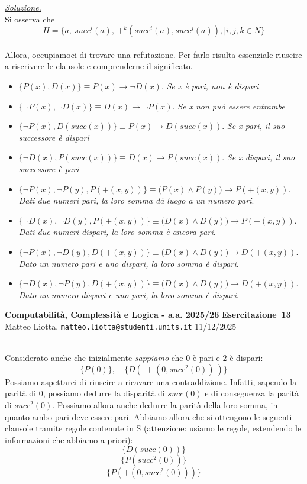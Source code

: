 \documentclass[a4paper,10pt]{article}
\makeatletter
\newcommand{\EsercitazioneNum}{13}
\newcommand{\Data}{11/12/2025}
\newcommand{\DocType}{Esercitazione} %
\newcommand{\FullTitle}{\DocType\ \EsercitazioneNum}
\newcommand{\Header}{
\noindent
  \small \textbf{Computabilità, Complessità e Logica - a.a. 2025/26} \hfill \textbf{\FullTitle} \\[0.2cm]
  \scriptsize Matteo Liotta, \texttt{matteo.liotta@studenti.units.it} \hfill \Data \\[0.2cm]
  \noindent\makebox[\linewidth]{\rule{\linewidth}{0.4pt}} \\[0.3cm]}
\newcommand{\NewPageHeader}{
  \vfill
  \noindent\makebox[\linewidth]{\rule{\linewidth}{0.4pt}}
  \newpage
  {\Header}
}
\makeatother
\begin{document}
{\begin{itemize}[label=, leftmargin=0pt]
    \begin{osservazioni}
    \underline{\textit{Soluzione.}}\\
    Si osserva che 
    $$H=\{a,\ succ^i(a),\ +^k(succ^i(a),succ^j(a)), \mid i,j,k\in N \}$$\\
    Allora, occupiamoci di trovare una refutazione. Per farlo risulta essenziale riuscire a riscrivere le clausole e comprenderne il significato.
    \begin{itemize}
        \item $\{P(x), D(x)\}\equiv P(x)\rightarrow\lnot D(x)$. \textit{Se x è pari, non è dispari}
        \item $\{\lnot P(x), \lnot D(x)\}\equiv D(x)\rightarrow\lnot P(x)$. \textit{Se x non può essere entrambe}
        \item $\{\lnot P(x), D(succ(x))\}\equiv P(x)\rightarrow D(succ(x))$. \textit{Se x pari, il suo successore è dispari}
        \item $\{\lnot D(x), P(succ(x))\}\equiv D(x)\rightarrow P(succ(x))$. \textit{Se x dispari, il suo successore è pari}
        \item $\{\lnot P(x), \lnot P(y), P(+(x, y))\}\equiv \bigg( P(x)\land P(y) \bigg)\rightarrow P(+(x,y))$. \textit{Dati due numeri pari, la loro somma dà luogo a un numero pari}.
        \item $\{\lnot D(x), \lnot D(y), P(+(x, y))\}\equiv \bigg( D(x)\land D(y) \bigg)\rightarrow P(+(x,y))$. \textit{Dati due numeri dispari, la loro somma è ancora pari}.
        \item $\{\lnot P(x), \lnot D(y), D(+(x, y))\}\equiv \bigg( D(x)\land D(y) \bigg)\rightarrow D(+(x,y))$. \textit{Dato un numero pari e uno dispari, la loro somma è dispari}.
        \item $\{\lnot D(x), \lnot P(y), D(+(x, y))\}\equiv \bigg( D(x)\land D(y) \bigg)\rightarrow D(+(x,y))$. \textit{Dato un numero dispari e uno pari, la loro somma è dispari}.
    \end{itemize}
    
    \end{osservazioni}
    \NewPageHeader
    \begin{osservazioni}
    Considerato anche che inizialmente \textit{sappiamo} che \textit{$0$} è pari e $2$ è dispari:
    $$\{P(0)\},\quad \{D(\ +(0, succ^2(0))\ )\}$$
    Possiamo aspettarci di riuscire a ricavare una contraddizione. Infatti, sapendo la parità di $0$, possiamo dedurre la disparità di $succ(0)$ e di conseguenza la parità di $succ^2(0)$. Possiamo allora anche dedurre la parità della loro somma, in quanto ambo pari deve essere pari. Abbiamo allora che si ottengono le seguenti clausole tramite regole contenute in S (attenzione: usiamo le regole, estendendo le informazioni che abbiamo a priori):
    $$\{D(succ(0))\}$$
    $$\{P(succ^2(0))\}$$
    $$\{P(+(0,succ^2(0)))\}$$
    

\end{osservazioni}
\end{itemize}}
\end{document}
